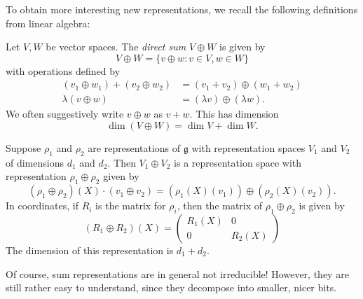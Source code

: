 \documentclass[a4paper]{article}
\begin{document}
To obtain more interesting new representations, we recall the following definitions from linear algebra:
\begin{defi}
  Let $V, W$ be vector spaces. The \emph{direct sum} $V \oplus W$ is given by
  \[
    V \oplus W = \{v \oplus w: v \in V, w \in W\}
  \]
  with operations defined by
  \begin{align*}
    (v_1 \oplus w_1) + (v_2 \oplus w_2) &= (v_1 + v_2) \oplus (w_1 + w_2)\\
    \lambda(v \oplus w) &= (\lambda v) \oplus (\lambda w).
  \end{align*}
  We often suggestively write $v \oplus w$ as $v + w$. This has dimension
  \[
    \dim(V \oplus W) = \dim V + \dim W.
  \]
\end{defi}

\begin{defi}
  Suppose $\rho_1$ and $\rho_2$ are representations of $\mathfrak{g}$ with representation spaces $V_1$ and $V_2$ of dimensions $d_1$ and $d_2$. Then $V_1 \oplus V_2$ is a representation space with representation $\rho_1 \oplus \rho_2$ given by
  \[
    (\rho_1 \oplus \rho_2)(X) \cdot (v_1 \oplus v_2) = (\rho_1(X)(v_1)) \oplus (\rho_2(X)(v_2)).
  \]
  In coordinates, if $R_i$ is the matrix for $\rho_i$, then the matrix of $\rho_1 \oplus \rho_2$ is given by
  \[
    (R_1 \oplus R_2)(X) =
    \begin{pmatrix}
      R_1(X) & 0\\
      0 & R_2(X)
    \end{pmatrix}
  \]
  The dimension of this representation is $d_1 + d_2$.
\end{defi}
Of course, sum representations are in general not irreducible! However, they are still rather easy to understand, since they decompose into smaller, nicer bits.
\end{document}
